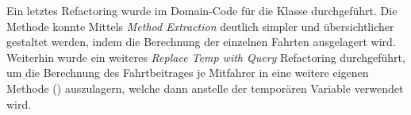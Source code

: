 Ein letztes Refactoring wurde im Domain-Code für die Klasse \href{https://github.com/yschiebelhut/carpool-java/blob/39b9b0aa5415a201103c65226606de2d73cf6ab0/3-carpool-java-domain/src/main/java/model/Fahrperiode.java#L86}{} durchgeführt.
Die Methode  konnte Mittels \emph{Method Extraction} deutlich simpler und übersichtlicher gestaltet werden, indem die Berechnung der einzelnen Fahrten ausgelagert wird.
Weiterhin wurde ein weiteres \emph{Replace Temp with Query} Refactoring durchgeführt, um die Berechnung des Fahrtbeitrages je Mitfahrer in eine weitere eigenen Methode () auszulagern, welche dann anstelle der temporären Variable verwendet wird.
